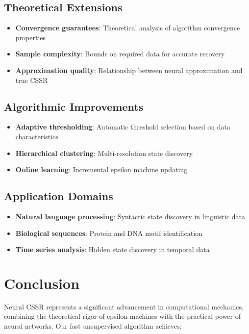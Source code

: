 \documentclass[12pt]{article}
\begin{document}
\subsection{Theoretical Extensions}

\begin{itemize}
    \item \textbf{Convergence guarantees}: Theoretical analysis of algorithm convergence properties
    \item \textbf{Sample complexity}: Bounds on required data for accurate recovery
    \item \textbf{Approximation quality}: Relationship between neural approximation and true CSSR
\end{itemize}

\subsection{Algorithmic Improvements}

\begin{itemize}
    \item \textbf{Adaptive thresholding}: Automatic threshold selection based on data characteristics
    \item \textbf{Hierarchical clustering}: Multi-resolution state discovery
    \item \textbf{Online learning}: Incremental epsilon machine updating
\end{itemize}

\subsection{Application Domains}

\begin{itemize}
    \item \textbf{Natural language processing}: Syntactic state discovery in linguistic data
    \item \textbf{Biological sequences}: Protein and DNA motif identification
    \item \textbf{Time series analysis}: Hidden state discovery in temporal data
\end{itemize}

\section{Conclusion}

Neural CSSR represents a significant advancement in computational mechanics, combining the theoretical rigor of epsilon machines with the practical power of neural networks. Our fast unsupervised algorithm achieves:
\end{document}
